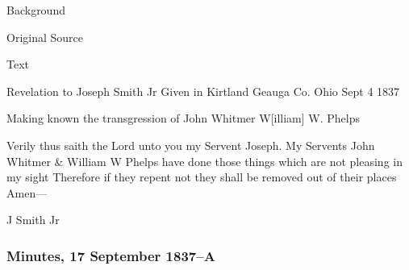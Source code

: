 				\begin{description}
					\item[Background]
				\end{description}
				
				
				\begin{description}
					\item[Original Source]
				\end{description}
				
				
				\begin{description}
					\item[Text]
				\end{description}
				
					\begin{tightcenter}
					Revelation to Joseph Smith Jr Given in Kirtland Geauga Co. Ohio Sept 4 1837
					\end{tightcenter}

					Making known the transgression of John Whitmer W[illiam] W. Phelps

					Verily thus saith the Lord unto you my Servent Joseph. My Servents John Whitmer \& William W Phelps have done those things which are not pleasing in my sight Therefore if they repent not they shall be removed out of their places Amen---

					\begin{tightright}
					J Smith Jr
					\end{tightright}
					
		\subsubsection{Minutes, 17 September 1837--A}
			\label{EMS-1837-JS-17-SEP-1837-A}
			
